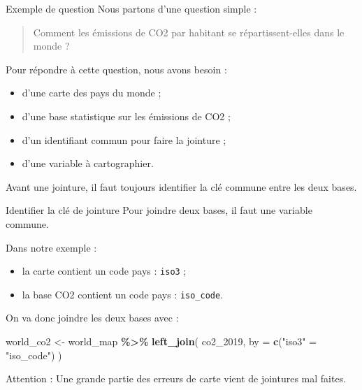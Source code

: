 \documentclass[
  10pt,
  ignorenonframetext,
]{beamer}
\newenvironment{Shaded}{\begin{snugshade}}{\end{snugshade}}
\newcommand{\AttributeTok}[1]{\textcolor[rgb]{0.13,0.29,0.53}{#1}}
\newcommand{\FunctionTok}[1]{\textcolor[rgb]{0.13,0.29,0.53}{\textbf{#1}}}
\newcommand{\NormalTok}[1]{#1}
\newcommand{\OtherTok}[1]{\textcolor[rgb]{0.56,0.35,0.01}{#1}}
\newcommand{\SpecialCharTok}[1]{\textcolor[rgb]{0.81,0.36,0.00}{\textbf{#1}}}
\newcommand{\StringTok}[1]{\textcolor[rgb]{0.31,0.60,0.02}{#1}}
\begin{document}
\begin{frame}{Exemple de question}
\label{exemple-de-question}
Nous partons d'une question simple :

\begin{quote}
Comment les émissions de CO2 par habitant se répartissent-elles dans le monde ?
\end{quote}

Pour répondre à cette question, nous avons besoin :

\begin{itemize}
  \item d’une carte des pays du monde ;
  \item d’une base statistique sur les émissions de CO2 ;
  \item d’un identifiant commun pour faire la jointure ;
  \item d’une variable à cartographier.
\end{itemize}

Avant une jointure, il faut toujours identifier la clé commune entre les
deux bases.
\end{frame}

\begin{frame}[fragile]{Identifier la clé de jointure}
\label{identifier-la-cluxe9-de-jointure}
Pour joindre deux bases, il faut une variable commune.

Dans notre exemple :

\begin{itemize}
  \item la carte contient un code pays : \texttt{iso3} ;
  \item la base CO2 contient un code pays : \texttt{iso\_code}.
\end{itemize}

On va donc joindre les deux bases avec :

\begin{Shaded}
\begin{Highlighting}[]
\NormalTok{world\_co2 }\OtherTok{\textless{}{-}}\NormalTok{ world\_map }\SpecialCharTok{\%\textgreater{}\%}
  \FunctionTok{left\_join}\NormalTok{(}
\NormalTok{    co2\_2019,}
    \AttributeTok{by =} \FunctionTok{c}\NormalTok{(}\StringTok{"iso3"} \OtherTok{=} \StringTok{"iso\_code"}\NormalTok{)}
\NormalTok{  )}
\end{Highlighting}
\end{Shaded}

Attention : Une grande partie des erreurs de carte vient de jointures
mal faites.
\end{frame}
\end{document}
